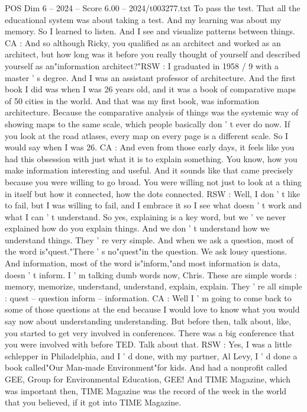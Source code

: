 \begin{textsample}{POS Dim 6 – 2024 – Score 6.00 – 2024/t003277.txt}
To pass the test.
That all the educational system was about taking a test.
And my learning was about my memory.
So I learned to listen.
And I see and visualize patterns between things.
CA : And so although Ricky, you qualified as an architect and worked as an architect, but how long was it before you really thought of yourself and described yourself as an"information architect?"RSW : I graduated in 1958 / 9 with a master ' s degree.
And I was an assistant professor of architecture.
And the first book I did was when I was 26 years old, and it was a book of comparative maps of 50 cities in the world.
And that was my first book, was information architecture.
Because the comparative analysis of things was the systemic way of showing maps to the same scale, which people basically don ' t ever do now.
If you look at the road atlases, every map on every page is a different scale.
So I would say when I was 26.
CA : And even from those early days, it feels like you had this obsession with just what it is to explain something.
You know, how you make information interesting and useful.
And it sounds like that came precisely because you were willing to go broad.
You were willing not just to look at a thing in itself but how it connected, how the dots connected.
RSW : Well, I don ' t like to fail, but I was willing to fail, and I embrace it so I see what doesn ' t work and what I can ' t understand.
So yes, explaining is a key word, but we ' ve never explained how do you explain things.
And we don ' t understand how we understand things.
They ' re very simple.
And when we ask a question, most of the word is"quest."There ' s no"quest"in the question.
We ask lousy questions.
And information, most of the word is"inform,"and most information is data, doesn ' t inform.
I ' m talking dumb words now, Chris.
These are simple words : memory, memorize, understand, understand, explain, explain.
They ' re all simple : quest -- question inform -- information.
CA : Well I ' m going to come back to some of those questions at the end because I would love to know what you would say now about understanding understanding.
But before then, talk about, like, you started to get very involved in conferences.
There was a big conference that you were involved with before TED.
Talk about that.
RSW : Yes, I was a little schlepper in Philadelphia, and I ' d done, with my partner, Al Levy, I ' d done a book called"Our Man-made Environment"for kids.
And had a nonprofit called GEE, Group for Environmental Education, GEE!
And TIME Magazine, which was important then, TIME Magazine was the record of the week in the world that you believed, if it got into TIME Magazine.

\end{textsample}
